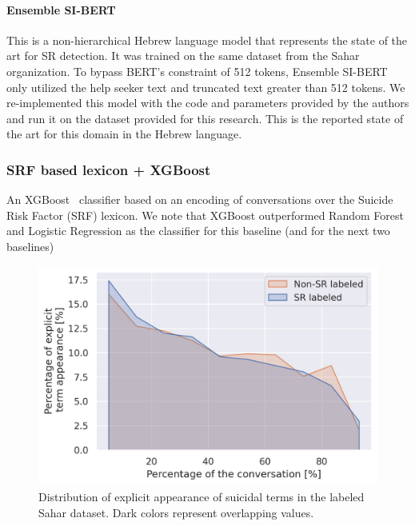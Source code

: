\documentclass[letterpaper]{article} %
\begin{document}
 \paragraph{Ensemble SI-BERT~\cite{amir}}
 This is a non-hierarchical Hebrew language model
 that represents the state of the art for SR detection. It was trained on the same dataset from the Sahar organization.  To bypass BERT's constraint of 512 tokens, Ensemble SI-BERT only utilized the help seeker text and truncated text greater than 512 tokens. %
We re-implemented this model with the code and parameters provided by the authors and run it on the dataset provided for this research.
 This is the reported state of the art for this domain in the Hebrew language.


\subsubsection{SRF based lexicon + XGBoost}
An XGBoost~\cite{chen2016xgboost} classifier based on  an encoding of conversations over the Suicide Risk Factor (SRF) lexicon. We note that XGBoost outperformed Random Forest and Logistic Regression as the classifier for this baseline (and for the next two baselines)

\begin{figure}[t]
\centering
\includegraphics[width=1.05\columnwidth]{figures/explicit_mention.jpg}
\caption{Distribution of explicit appearance of suicidal terms in  the labeled Sahar dataset. Dark colors represent overlapping values.}
\label{fig:ExplictDis}
\end{figure}
\end{document}
